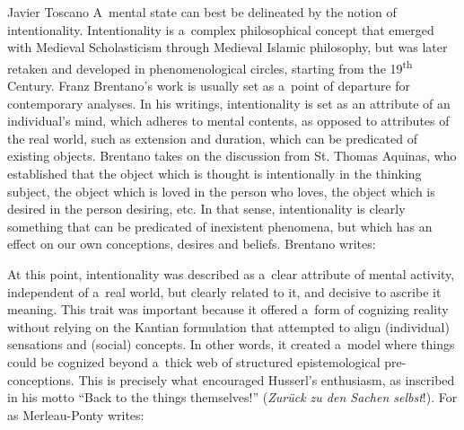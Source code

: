 \begin{artengenv}{Javier Toscano}
A~mental state can best be delineated by the notion of intentionality. Intentionality is a~complex philosophical concept that emerged with Medieval Scholasticism through Medieval Islamic philosophy, but was later retaken and developed in phenomenological circles, starting from the 19\textsuperscript{th} Century. Franz Brentano's work is usually set as a~point of departure for contemporary analyses. In his writings, intentionality is set as an attribute of an individual's mind, which adheres to mental contents, as opposed to attributes of the real world, such as extension and duration, which can be predicated of existing objects. Brentano takes on the discussion from St. Thomas Aquinas, who established that the object which is thought is intentionally in the thinking subject, the object which is loved in the person who loves, the object which is desired in the person desiring, etc. In that sense, intentionality is clearly something that can be predicated of inexistent phenomena, but which has an effect on our own conceptions, desires and beliefs. Brentano
\parencite*[][p.68]{brentano_psychology_1995} %
 writes:

At this point, intentionality was described as a~clear attribute of mental activity, independent of a~real world, but clearly related to it, and decisive to ascribe it meaning. This trait was important because it offered a~form of cognizing reality without relying on the Kantian formulation that attempted to align (individual) sensations and (social) concepts. In other words, it created a~model where things could be cognized beyond a~thick web of structured epistemological pre-conceptions. This is precisely what encouraged Husserl's enthusiasm, as inscribed in his motto ``Back to the things themselves!'' (\textit{Zurück zu den Sachen selbst}!). For as Merleau-Ponty
\parencite*[][p.xix]{merleau-ponty_phenomenology_2005} %
 writes:


\end{artengenv}
